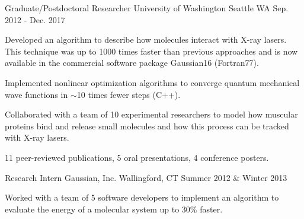 \begin{cventries}
\cventry
{Graduate/Postdoctoral Researcher} %
{University of Washington} %
{Seattle WA} %
{Sep. 2012 - Dec. 2017} %
{ 
\begin{cvitems}
 \vspace{0.1cm}
\item{Developed an algorithm to describe how molecules interact with X-ray lasers. This technique was up to 1000 times faster than previous approaches and is now available in the commercial software package Gaussian16 (Fortran77).\vspace{0.1cm}}
\item{Implemented nonlinear optimization algorithms to converge quantum mechanical wave functions in $\sim$10 times fewer steps (C++).\vspace{0.1cm}}
\item{Collaborated with a team of 10 experimental researchers to model how muscular proteins bind and release small molecules and how this process can be tracked with X-ray lasers.\vspace{0.1cm}}
\item{11 peer-reviewed publications, 5 oral presentations, 4 conference posters.}
\end{cvitems}
}


\cventry
{Research Intern} %
{Gaussian, Inc.} %
{Wallingford, CT} %
{Summer 2012 \& Winter 2013} %
{ 
\begin{cvitems}
 \vspace{0.1cm}
\item{Worked with a team of 5 software developers to implement an algorithm to evaluate the energy of a molecular system up to 30\% faster.}
\end{cvitems}
}


\end{cventries}
